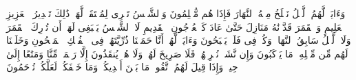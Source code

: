وَءَایَةࣱ لَّهُمُ ٱلَّیۡلُ نَسۡلَخُ مِنۡهُ ٱلنَّهَارَ فَإِذَا هُم مُّظۡلِمُونَ%
\stopbuffer
\startbuffer[\q:36:38]
وَٱلشَّمۡسُ تَجۡرِی لِمُسۡتَقَرࣲّ لَّهَاۚ ذَٰلِكَ تَقۡدِیرُ ٱلۡعَزِیزِ ٱلۡعَلِیمِ%
\stopbuffer
\startbuffer[\q:36:39]
وَٱلۡقَمَرَ قَدَّرۡنَٰهُ مَنَازِلَ حَتَّىٰ عَادَ كَٱلۡعُرۡجُونِ ٱلۡقَدِیمِ%
\stopbuffer
\startbuffer[\q:36:40]
لَا ٱلشَّمۡسُ یَنۢبَغِی لَهَاۤ أَن تُدۡرِكَ ٱلۡقَمَرَ وَلَا ٱلَّیۡلُ سَابِقُ ٱلنَّهَارِۚ وَكُلࣱّ فِی فَلَكࣲ یَسۡبَحُونَ%
\stopbuffer
\startbuffer[\q:36:41]
وَءَایَةࣱ لَّهُمۡ أَنَّا حَمَلۡنَا ذُرِّیَّتَهُمۡ فِی ٱلۡفُلۡكِ ٱلۡمَشۡحُونِ%
\stopbuffer
\startbuffer[\q:36:42]
وَخَلَقۡنَا لَهُم مِّن مِّثۡلِهِۦ مَا یَرۡكَبُونَ%
\stopbuffer
\startbuffer[\q:36:43]
وَإِن نَّشَأۡ نُغۡرِقۡهُمۡ فَلَا صَرِیخَ لَهُمۡ وَلَا هُمۡ یُنقَذُونَ%
\stopbuffer
\startbuffer[\q:36:44]
إِلَّا رَحۡمَةࣰ مِّنَّا وَمَتَٰعًا إِلَىٰ حِینࣲ%
\stopbuffer
\startbuffer[\q:36:45]
وَإِذَا قِیلَ لَهُمُ ٱتَّقُوا۟ مَا بَیۡنَ أَیۡدِیكُمۡ وَمَا خَلۡفَكُمۡ لَعَلَّكُمۡ تُرۡحَمُونَ%
\stopbuffer
